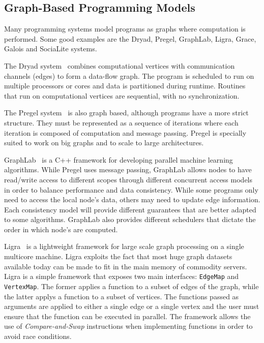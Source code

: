 \subsection{Graph-Based Programming Models}

Many programming systems model programs as graphs where computation is
performed. Some good examples are the Dryad, Pregel, GraphLab, Ligra, Grace,
Galois and SociaLite systems.

The Dryad system~\cite{Isard:2007:DDD:1272996.1273005} combines computational
vertices with communication channels (edges) to form a data-flow graph. The
program is scheduled to run on multiple processors or cores and data is
partitioned during runtime. Routines that run on computational vertices are
sequential, with no synchronization.

The Pregel system~\cite{Malewicz:2010:PSL:1807167.1807184} is also graph based,
although programs have a more strict structure. They must be represented as
a sequence of iterations where each iteration is composed of computation and
message passing.  Pregel is specially suited to work on big graphs and to
scale to large architectures.

GraphLab~\cite{GraphLab2010} is a C++ framework for developing parallel machine
learning algorithms. While Pregel uses message passing, GraphLab allows nodes to
have read/write access to different scopes through different concurrent access
models in order to balance performance and data consistency. While some programs
only need to access the local node's data, others may need to update edge
information. Each consistency model will provide different guarantees that are
better adapted to some algorithms. GraphLab also provides different schedulers
that dictate the order in which node's are computed.

Ligra~\cite{Shun:2013:LLG:2517327.2442530} is a lightweight framework for large scale
graph processing on a single multicore machine. Ligra exploits the fact that
most huge graph datasets available today can be made to fit in the main memory
of commodity servers. Ligra is a simple framework that exposes 
two main interfaces: \texttt{EdgeMap} and \texttt{VertexMap}. The former applies
a function to a subset of edges of the graph, while the latter applys a function
to a subset of vertices. The functions passed as arguments are applied to either
a single edge or a single vertex and the user must ensure that the function can
be executed in parallel. The framework allows the use of \emph{Compare-and-Swap}
instructions when implementing functions in order to avoid race conditions.

